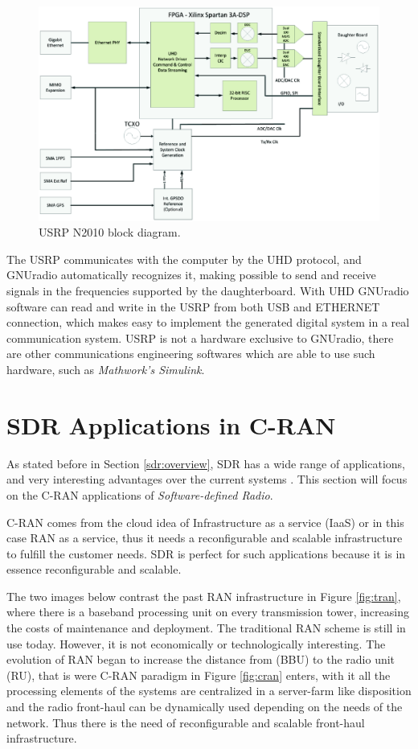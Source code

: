 \begin{figure}[htbp]
    \centering
    \includegraphics[width=.90\textwidth]{./figures/usrp_bd}
    \caption{ USRP N2010 block diagram.
    \label{fig:usrpbd}}
\end{figure}

The USRP communicates with the computer by the UHD protocol, and GNUradio
automatically recognizes it, making possible to send and receive signals in the
frequencies supported by the daughterboard. With UHD GNUradio software can read
and write in the USRP from both USB and ETHERNET connection, which makes easy to
implement the generated digital system in a real communication system. USRP is
not a hardware exclusive to GNUradio, there are other communications engineering
softwares which are able to use such hardware, such as \textit{Mathwork's
Simulink}.

\section{SDR Applications in C-RAN}
\label{sec:sdr_app}

As stated before in Section \ref{sdr:overview}, SDR has a wide range of
applications, and very interesting advantages over the current systems
\cite{alan2008} \cite{dayananda2012}. This section will focus on the C-RAN
applications of \emph{Software-defined Radio}.

C-RAN comes from the cloud idea of Infrastructure as a service (IaaS) or in this
case RAN as a service, thus it needs a reconfigurable and scalable
infrastructure to fulfill the customer needs. SDR is perfect for such
applications because  it is in essence reconfigurable and scalable.

The two images below contrast the past RAN infrastructure in Figure
\ref{fig:tran}, where there is a baseband processing unit on every transmission
tower, increasing the costs of maintenance and deployment. The traditional RAN
scheme is still in use today. However, it is not economically or technologically
interesting. The evolution of RAN began to increase the distance from (BBU) to
the radio unit (RU), that is were C-RAN paradigm in Figure \ref{fig:cran}
enters, with it all the processing elements of the systems are centralized in a
server-farm like disposition and the radio front-haul can be dynamically used
depending on the needs of the network. Thus there is the need of reconfigurable
and scalable front-haul infrastructure.


